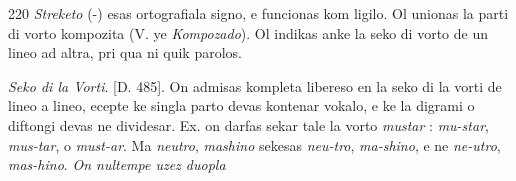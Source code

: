 \begin{VUpage}[224]{220}
\textit{Streketo} (-) esas ortografiala signo, e funcionas kom ligilo.\nl
Ol unionas la parti di vorto kompozita (V. ye \textit{Kompozado}).\nl
Ol indikas anke la seko di vorto de un lineo ad altra, pri\nl
qua ni quik parolos.

\textit{Seko di la Vorti}. [D. 485]. On admisas kompleta libereso\nl
en la seko di la vorti de lineo a lineo, ecepte ke singla parto\nl
devas kontenar vokalo, e ke la digrami o diftongi devas ne\nl
dividesar. Ex. on darfas sekar tale la vorto \textit{mustar} : \textit{mu-star},\nl
\textit{mus-tar}, o \textit{must-ar}. Ma \textit{neutro}, \textit{mashino} sekesas \textit{neu-tro},\nl
\textit{ma-shino}, e ne \textit{ne-utro}, \textit{mas-hino}. \textit{On nultempe uzez duopla}\nl
\end{VUpage}

